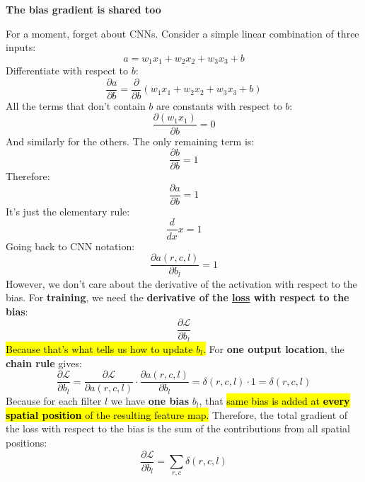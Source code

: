 \begin{flushleft}
    \textcolor{Green3}{ \textbf{The bias gradient is shared too}}
\end{flushleft}
For a moment, forget about CNNs. Consider a simple linear combination of three inputs:
\begin{equation*}
    a = w_1x_1+w_2x_2+w_3x_3+b
\end{equation*}
Differentiate with respect to $b$:
\begin{equation*}
    \frac{\partial a}{\partial b}
    =
    \frac{\partial}{\partial b}
    (w_1x_1+w_2x_2+w_3x_3+b)
\end{equation*}
All the terms that don't contain $b$ are constants with respect to $b$:
\begin{equation*}
    \frac{\partial(w_1x_1)}{\partial b}=0
\end{equation*}
And similarly for the others. The only remaining term is:
\begin{equation*}
    \frac{\partial b}{\partial b}=1
\end{equation*}
Therefore:
\begin{equation*}
    \frac{\partial a}{\partial b}=1
\end{equation*}
It's just the elementary rule:
\begin{equation*}
    \frac{d}{dx}x=1
\end{equation*}
Going back to CNN notation:
\begin{equation*}
    \frac{\partial a(r,c,l)}
    {\partial b_l}=1
\end{equation*}
However, we don't care about the derivative of the activation with respect to the bias. For \textbf{training}, we need the \textbf{derivative of the \underline{loss} with respect to the bias}:
\begin{equation*}
    \frac{\partial\mathcal{L}}{\partial b_l}
\end{equation*}
\hl{Because that's what tells us how to update $b_l$.} For \textbf{one output location}, the \textbf{chain rule} gives:
\begin{equation*}
    \frac{\partial\mathcal{L}}{\partial b_l}
    =
    \frac{\partial\mathcal{L}}{\partial a(r,c,l)} \cdot
    \frac{\partial a(r,c,l)}{\partial b_l}
    =
    \delta(r,c,l) \cdot 1
    =
    \delta(r,c,l)
\end{equation*}
Because for each filter $l$ we have \textbf{one bias} $b_l$, that \hl{same bias is added at \textbf{every spatial position} of the resulting feature map.} Therefore, the total gradient of the loss with respect to the bias is the sum of the contributions from all spatial positions:
\begin{equation}\label{eq:gradient-of-loss-wrt-conv-bias}
    \frac{\partial\mathcal{L}}{\partial b_l} = \sum_{r,c} \delta(r,c,l)
\end{equation}

